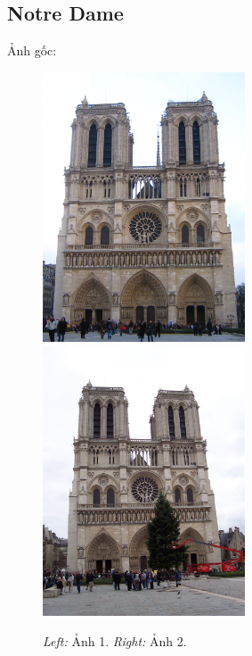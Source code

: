 \documentclass[11pt]{article}
\begin{document}
\subsection*{Notre Dame}
Ảnh gốc:
\begin{figure}[H]
    \centering
    \includegraphics[width=6cm]{images/notre_dame/NotreDame1.jpg}
    \includegraphics[width=6cm]{images/notre_dame/NotreDame2.jpg}
    \caption{\emph{Left:} Ảnh 1. \emph{Right:} Ảnh 2.}
\end{figure}
\end{document}
